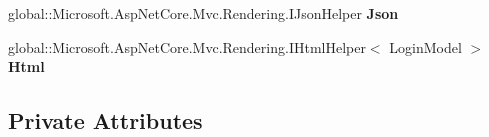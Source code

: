 \begin{DoxyCompactItemize}
global\+::\+Microsoft.\+Asp\+Net\+Core.\+Mvc.\+Rendering.\+I\+Json\+Helper {\bfseries Json}
\item 
\mbox{\label{class_projeto_e_s_w_1_1_areas_1_1_identity_1_1_pages_1_1_account_1_1_areas___identity___pages___account___login_ab68b0ad8acfccd34acceeebdec77a940}} 
global\+::\+Microsoft.\+Asp\+Net\+Core.\+Mvc.\+Rendering.\+I\+Html\+Helper$<$ Login\+Model $>$ {\bfseries Html}
\end{DoxyCompactItemize}
\subsection*{Private Attributes}
